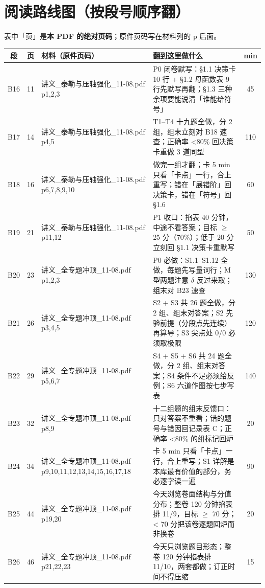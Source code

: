 \documentclass[10pt,a4paper]{ctexart}
\renewcommand{\arraystretch}{1.30}
\begin{document}
\clearpage

\section*{阅读路线图（按段号顺序翻）}
{\small 表中「页」是\textbf{本 PDF 的绝对页码}；原件页码写在材料列的 p 后面。}
\footnotesize
\setlength{\tabcolsep}{2pt}
\renewcommand{\arraystretch}{0.86}
\begin{longtable}{c|c|p{4.5cm}|p{6.6cm}|c}
\toprule
段 & 页 & 材料（原件页码） & 翻到这里做什么 & min \\
\midrule
\endhead
B16 & 11 & 讲义\_泰勒与压轴强化\_11-08.pdf p1,2,3 & P0 闭卷默写：§1.1 决策卡 10 行 + §1.2 母函数表 9 行先默写再翻；§1.3 三种余项要能说清「谁能给符号」 & 45\\
B17 & 14 & 讲义\_泰勒与压轴强化\_11-08.pdf p4,5 & T1--T4 十九题全做，分 2 组，组末立刻对 B18 速查；正确率 <80\% 回决策卡重做 3 道同型 & 110\\
B18 & 16 & 讲义\_泰勒与压轴强化\_11-08.pdf p6,7,8,9,10 & 做完一组才翻；卡 5 min 只看「卡点」一行，合上重写；错在「展错阶」回决策卡，错在「符号」回 §1.6 & 60\\
B19 & 21 & 讲义\_泰勒与压轴强化\_11-08.pdf p11,12 & P1 收口：掐表 40 分钟，中途不看答案；目标 $\geq$ 25 分（70\%）；低于 20 分立刻回 §1.1 决策卡重默写 & 50\\
B20 & 23 & 讲义\_全专题冲顶\_11-08.pdf p1,2,3 & P0 必做：S1.1--S1.12 全做，每题先写量词行；M 型两题注意 $\delta$ 反过来取；组末对 B23 速查 & 130\\
B21 & 26 & 讲义\_全专题冲顶\_11-08.pdf p3,4,5 & S2 + S3 共 26 题全做，分 2 组、组末对答案；S2 先验前提（分段点先连续）再算导；S3 尖点处 0/0 必须取极限 & 120\\
B22 & 29 & 讲义\_全专题冲顶\_11-08.pdf p5,6,7 & S4 + S5 + S6 共 24 题全做，分 2 组、组末对答案；S4 条件不足必须给反例；S6 六道作图按七步写表 & 140\\
B23 & 32 & 讲义\_全专题冲顶\_11-08.pdf p8,9 & 十二组题的组末反馈口：只对答案不重看；错的题号与错因回记录表 C；正确率 <80\% 的组标记回炉 & 20\\
B24 & 34 & 讲义\_全专题冲顶\_11-08.pdf p9,10,11,12,13,14,15,16,17,18 & 卡 5 min 只看「卡点」一行，合上重写；S1 详解是本库最有价值的部分，务必逐字读一遍 & 90\\
B25 & 44 & 讲义\_全专题冲顶\_11-08.pdf p19,20 & 今天浏览卷面结构与分值分布；整卷 120 分钟掐表排 11/9，目标 $\geq$ 70 分；< 70 分把该卷逐题回炉而非换卷 & 20\\
B26 & 46 & 讲义\_全专题冲顶\_11-08.pdf p21,22,23 & 今天只浏览题目形态；整卷 120 分钟掐表排 11/10，两套都做；订正时间不得压缩 & 15\\

\end{longtable}
\end{document}
